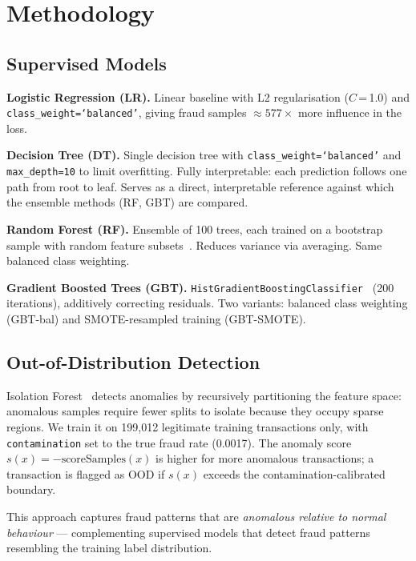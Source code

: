 \documentclass[conference]{IEEEtran}
\begin{document}
\section{Methodology}

\subsection{Supervised Models}

\textbf{Logistic Regression (LR).} Linear baseline with L2 regularisation
($C$\,=\,1.0) and \texttt{class\_weight=`balanced'}, giving fraud samples
${\approx}577\times$ more influence in the loss.

\textbf{Decision Tree (DT).} Single decision tree with
\texttt{class\_weight=`balanced'} and \texttt{max\_depth=10} to limit
overfitting. Fully interpretable: each prediction follows one path from root
to leaf. Serves as a direct, interpretable reference against which the
ensemble methods (RF, GBT) are compared.

\textbf{Random Forest (RF).} Ensemble of 100 trees, each trained on a
bootstrap sample with random feature subsets~\cite{breiman2001rf}. Reduces
variance via averaging. Same balanced class weighting.

\textbf{Gradient Boosted Trees (GBT).}
\texttt{HistGradientBoostingClassifier}~\cite{sklearn} (200 iterations),
additively correcting residuals. Two variants: balanced class weighting
(GBT-bal) and SMOTE-resampled training (GBT-SMOTE).

\subsection{Out-of-Distribution Detection}

Isolation Forest~\cite{liu2008isolation} detects anomalies by recursively
partitioning the feature space: anomalous samples require fewer splits to
isolate because they occupy sparse regions. We train it on 199,012 legitimate
training transactions only, with \texttt{contamination} set to the true fraud
rate (0.0017). The anomaly score $s(x) = -\text{scoreSamples}(x)$ is higher
for more anomalous transactions; a transaction is flagged as OOD if
$s(x)$ exceeds the contamination-calibrated boundary.

This approach captures fraud patterns that are \textit{anomalous relative to
normal behaviour} --- complementing supervised models that detect fraud
patterns resembling the training label distribution.
\end{document}
